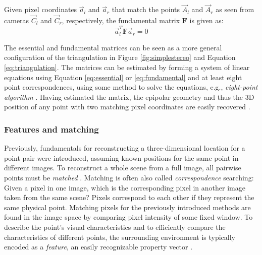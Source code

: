 Given pixel coordinates $\vec a_l$ and $\vec a_r$ that match the points $\vec A_l$ and $\vec A_r$ as seen from cameras $\vec C_l$ and $\vec C_r$, respectively, the fundamental matrix $\bm F$ is given as:
\begin{equation} \label{eq:fundamental}
	\vec a_l^T \bm F \vec a_r = 0
\end{equation}

%
%

The essential and fundamental matrices can be seen as a more general configuration of the triangulation in Figure \ref{fig:simplestereo} and Equation \ref{eq:triangulation}.
The matrices can be estimated by forming a system of linear equations using Equation \ref{eq:essential} or \ref{eq:fundamental} and at least eight point correspondences, using some method to solve the equations, e.g., \emph{eight-point algorithm} \cite[p. 155]{hartley03multiview}.
Having estimated the matrix, the epipolar geometry and thus the 3D position of any point with two matching pixel coordinates are easily recovered \cite[p. 162]{hartley03multiview}.



\subsubsection{Features and matching} %

Previously, fundamentals for reconstructing a three-dimensional location for a point pair were introduced, assuming known positions for the same point in different images.
To reconstruct a whole scene from a full image, all pairwise points must be \emph{matched} \cite[ch. 4]{szeliski10vision}.
Matching is often also called \emph{correspondence} searching:
Given a pixel in one image, which is the corresponding pixel in another image taken from the same scene?
Pixels correspond to each other if they represent the same physical point.
Matching pixels for the previously introduced methods are found in the image space by comparing pixel intensity of some fixed window.
To describe the point's visual characteristics and to efficiently compare the characteristics of different points, the surrounding environment is typically encoded as a \emph{feature}, an easily recognizable property vector \cite[ch. 4]{szeliski10vision}.

